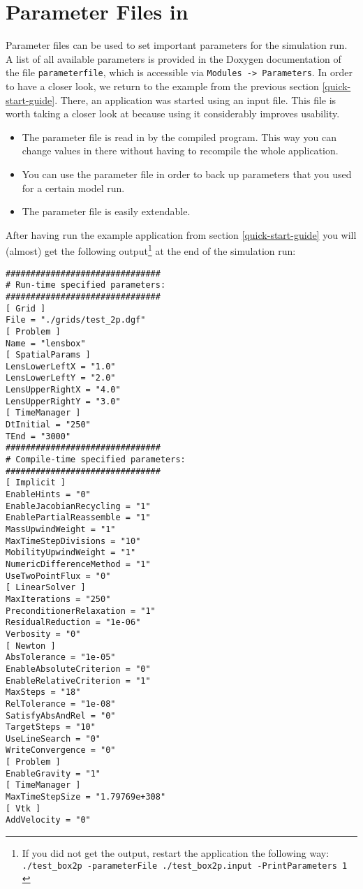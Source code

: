 \section{Parameter Files in \Dumux}
\label{sec:inputFiles}
Parameter files can be used to set important parameters for the simulation run. 
A list of all available parameters is provided in the Doxygen documentation 
of the file \texttt{parameterfile}, which is accessible via \texttt{Modules -> Parameters}.
In order to have a closer look, we return to the example from the 
previous section \ref{quick-start-guide}. There, an application was started using an input file. 
This file is worth taking a closer look at because using it considerably improves usability. 

\begin{itemize}
 \item The parameter file is read in by the compiled program. This way you can change 
values in there without having to recompile the whole application. 
\item You can use the parameter file in order to back up parameters that you used for a certain model run. 
\item The parameter file is easily extendable. 
\end{itemize}

After having run the example application from section \ref{quick-start-guide} you will (almost) get the following output\footnote{If you did not get the output, restart the application the following way:
  \texttt{./test{\_}box2p -parameterFile ./test\_box2p.input -PrintParameters 1 }} at the end of the simulation run:
\begin{lstlisting}[style=Bash]
###############################
# Run-time specified parameters:
###############################
[ Grid ]
File = "./grids/test_2p.dgf"
[ Problem ]
Name = "lensbox"
[ SpatialParams ]
LensLowerLeftX = "1.0"
LensLowerLeftY = "2.0"
LensUpperRightX = "4.0"
LensUpperRightY = "3.0"
[ TimeManager ]
DtInitial = "250"
TEnd = "3000"
###############################
# Compile-time specified parameters:
###############################
[ Implicit ]
EnableHints = "0"
EnableJacobianRecycling = "1"
EnablePartialReassemble = "1"
MassUpwindWeight = "1"
MaxTimeStepDivisions = "10"
MobilityUpwindWeight = "1"
NumericDifferenceMethod = "1"
UseTwoPointFlux = "0"
[ LinearSolver ]
MaxIterations = "250"
PreconditionerRelaxation = "1"
ResidualReduction = "1e-06"
Verbosity = "0"
[ Newton ]
AbsTolerance = "1e-05"
EnableAbsoluteCriterion = "0"
EnableRelativeCriterion = "1"
MaxSteps = "18"
RelTolerance = "1e-08"
SatisfyAbsAndRel = "0"
TargetSteps = "10"
UseLineSearch = "0"
WriteConvergence = "0"
[ Problem ]
EnableGravity = "1"
[ TimeManager ]
MaxTimeStepSize = "1.79769e+308"
[ Vtk ]
AddVelocity = "0"
\end{lstlisting}

